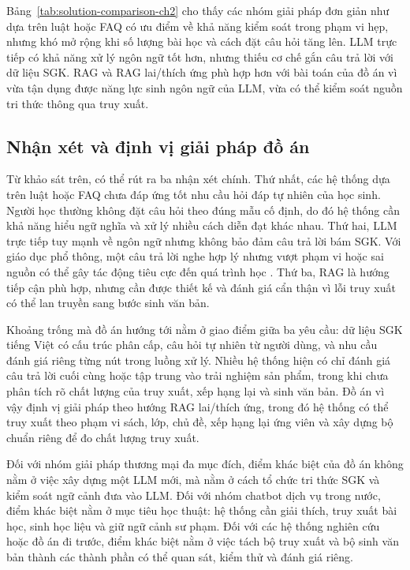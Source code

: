 \documentclass[../DoAn.tex]{subfiles}
\begin{document}
Bảng~\ref{tab:solution-comparison-ch2} cho thấy các nhóm giải pháp đơn giản như dựa trên luật hoặc FAQ có ưu điểm về khả năng kiểm soát trong phạm vi hẹp, nhưng khó mở rộng khi số lượng bài học và cách đặt câu hỏi tăng lên. LLM trực tiếp có khả năng xử lý ngôn ngữ tốt hơn, nhưng thiếu cơ chế gắn câu trả lời với dữ liệu SGK. RAG và RAG lai/thích ứng phù hợp hơn với bài toán của đồ án vì vừa tận dụng được năng lực sinh ngôn ngữ của LLM, vừa có thể kiểm soát nguồn tri thức thông qua truy xuất.

\subsection{Nhận xét và định vị giải pháp đồ án}

Từ khảo sát trên, có thể rút ra ba nhận xét chính. Thứ nhất, các hệ thống dựa trên luật hoặc FAQ chưa đáp ứng tốt nhu cầu hỏi đáp tự nhiên của học sinh. Người học thường không đặt câu hỏi theo đúng mẫu cố định, do đó hệ thống cần khả năng hiểu ngữ nghĩa và xử lý nhiều cách diễn đạt khác nhau. Thứ hai, LLM trực tiếp tuy mạnh về ngôn ngữ nhưng không bảo đảm câu trả lời bám SGK. Với giáo dục phổ thông, một câu trả lời nghe hợp lý nhưng vượt phạm vi hoặc sai nguồn có thể gây tác động tiêu cực đến quá trình học \cite{ji2023hallucination,yan2024llm_edu}. Thứ ba, RAG là hướng tiếp cận phù hợp, nhưng cần được thiết kế và đánh giá cẩn thận vì lỗi truy xuất có thể lan truyền sang bước sinh văn bản.

Khoảng trống mà đồ án hướng tới nằm ở giao điểm giữa ba yêu cầu: dữ liệu SGK tiếng Việt có cấu trúc phân cấp, câu hỏi tự nhiên từ người dùng, và nhu cầu đánh giá riêng từng nút trong luồng xử lý. Nhiều hệ thống hiện có chỉ đánh giá câu trả lời cuối cùng hoặc tập trung vào trải nghiệm sản phẩm, trong khi chưa phân tích rõ chất lượng của truy xuất, xếp hạng lại và sinh văn bản. Đồ án vì vậy định vị giải pháp theo hướng RAG lai/thích ứng, trong đó hệ thống có thể truy xuất theo phạm vi sách, lớp, chủ đề, xếp hạng lại ứng viên và xây dựng bộ chuẩn riêng để đo chất lượng truy xuất.

Đối với nhóm giải pháp thương mại đa mục đích, điểm khác biệt của đồ án không nằm ở việc xây dựng một LLM mới, mà nằm ở cách tổ chức tri thức SGK và kiểm soát ngữ cảnh đưa vào LLM. Đối với nhóm chatbot dịch vụ trong nước, điểm khác biệt nằm ở mục tiêu học thuật: hệ thống cần giải thích, truy xuất bài học, sinh học liệu và giữ ngữ cảnh sư phạm. Đối với các hệ thống nghiên cứu hoặc đồ án đi trước, điểm khác biệt nằm ở việc tách bộ truy xuất và bộ sinh văn bản thành các thành phần có thể quan sát, kiểm thử và đánh giá riêng.
\end{document}
